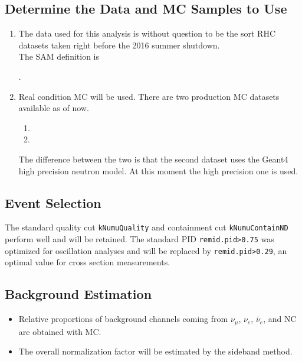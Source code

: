 \documentclass[12pt,a4paper,final]{iopart}
\begin{document}
\subsection{Determine the Data and MC Samples to Use}
\begin{enumerate}
  \item The data used for this analysis is without question to be the sort RHC datasets taken right before the 2016 summer shutdown.\\
  The SAM definition is \begin{small}\end{small}.
  \item Real condition MC will be used. There are two production MC datasets available as of now.
  \begin{footnotesize}
    \begin{enumerate}
      \item {}
      \item {}
    \end{enumerate}
  \end{footnotesize}
  The difference between the two is that the second dataset uses the Geant4 high precision neutron model. At this moment the high precision one is used.
\end{enumerate}

\subsection{Event Selection}
The standard quality cut \texttt{kNumuQuality} and containment cut \texttt{kNumuContainND} perform well and will be retained. The standard PID \texttt{remid.pid>0.75} was optimized for oscillation analyses and will be replaced by \texttt{remid.pid>0.29}, an optimal value for cross section measurements.

\subsection{Background Estimation}
\begin{itemize}
  \item Relative proportions of background channels coming from $\nu_\mu$, $\nu_e$, $\bar{\nu}_e$, and NC are obtained with MC.
  \item The overall normalization factor will be estimated by the sideband method.
\end{itemize}
\end{document}
